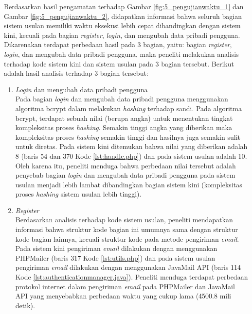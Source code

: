 Berdasarkan hasil pengamatan terhadap Gambar \ref{fig:5_pengujianwaktu_1} dan Gambar \ref{fig:5_pengujianwaktu_2}, didapatkan informasi bahwa seluruh bagian sistem usulan memiliki waktu eksekusi lebih cepat dibandingkan dengan sistem kini, kecuali pada bagian \textit{register}, \textit{login}, dan mengubah data pribadi pengguna. Dikarenakan terdapat perbedaan hasil pada 3 bagian, yaitu: bagian \textit{register}, \textit{login}, dan mengubah data pribadi pengguna, maka peneliti melakukan analisis terhadap kode sistem kini dan sistem usulan pada 3 bagian tersebut. Berikut adalah hasil analisis terhadap 3 bagian tersebut:
\begin{enumerate}
	\item \textit{Login} dan mengubah data pribadi pengguna\\
	Pada bagian \textit{login} dan mengubah data pribadi pengguna menggunakan algoritma bcrypt dalam melakukan \textit{hashing} terhadap sandi. Pada algoritma bcrypt, terdapat sebuah nilai (berupa angka) untuk menentukan tingkat kompleksitas proses \textit{hashing}\cite{jbcrypt}. Semakin tinggi angka yang diberikan maka kompleksitas proses \textit{hashing} semakin tinggi dan hasilnya juga semakin sulit untuk diretas. Pada sistem kini ditemukan bahwa nilai yang diberikan adalah 8 (baris 54 dan 370 Kode \ref{lst:handle.php}) dan pada sistem usulan adalah 10\cite{jbcrypt}. Oleh karena itu, peneliti menduga bahwa perbedaan nilai tersebut adalah penyebab bagian \textit{login} dan mengubah data pribadi pengguna pada sistem usulan menjadi lebih lambat dibandingkan bagian sistem kini (kompleksitas proses \textit{hashing} sistem usulan lebih tinggi).
	\item \textit{Register}\\
	Berdasarkan analisis terhadap kode sistem usulan, peneliti mendapatkan informasi bahwa struktur kode bagian ini umumnya sama dengan struktur kode bagian lainnya, kecuali struktur kode pada metode pengiriman \textit{email}. Pada sistem kini pengiriman \textit{email} dilakukan dengan menggunakan PHPMailer (baris 317 Kode \ref{lst:utils.php}) dan pada sistem usulan pengiriman \textit{email} dilakukan dengan menggunakan JavaMail API (baris 114 Kode \ref{lst:authenticationmanager.java}).  Peneliti menduga terdapat perbedaan protokol internet dalam pengiriman \textit{email} pada PHPMailer dan JavaMail API yang menyebabkan perbedaan waktu yang cukup lama (4500.8 mili detik). 
\end{enumerate}

